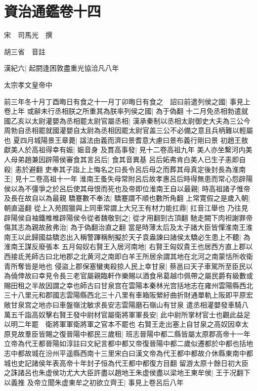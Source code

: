 \chapter{資治通鑑卷十四}
宋　司馬光　撰

胡三省　音註

漢紀六|{
	起閼逢困敦盡重光協洽凡八年}


太宗孝文皇帝中

前三年冬十月丁酉晦日有食之十一月丁卯晦日有食之　詔曰前遣列侯之國|{
	事見上卷上年}
或辭未行丞相朕之所重其為朕率列侯之國|{
	為于偽翻}
十二月免丞相勃遣就國乙亥以太尉灌嬰為丞相罷太尉官屬丞相|{
	漢承秦制以丞相太尉御史大夫為三公今周勃自丞相罷就國灌嬰自太尉為丞相因罷太尉官盖三公不必備之意且兵柄難以輕屬也}
夏四月城陽景王章薨|{
	諡法由義而濟曰景耆意大慮曰景布義行剛曰景}
初趙王敖獻美人於高祖得幸有娠|{
	娠音身}
及貫高事發|{
	見十二卷高祖九年}
美人亦坐繫河内美人母弟趙兼因辟陽侯審食其言呂后|{
	食其音異基}
呂后妬弗肯白美人已生子恚即自殺|{
	恚於避翻}
吏奉其子詣上上悔名之曰長令呂后母之而葬其母真定後封長為淮南王|{
	見十二卷高祖十一年}
淮南王蚤失母常附呂后故孝惠呂后時得無患而常心怨辟陽侯以為不彊爭之於呂后使其母恨而死也及帝即位淮南王自以最親|{
	時高祖諸子惟帝及長在故自以為最親}
驕蹇數不奉法|{
	驕蹇謂不順也數所角翻}
上常寛假之是歲入朝|{
	朝直遥翻}
從上入苑囿獵與上同車常謂上大兄王有材力能扛鼎|{
	扛音江舉也}
乃往見辟陽侯自袖鐵椎椎辟陽侯令從者魏敬剄之|{
	從才用翻剄古頂翻}
馳走闕下肉袒謝罪帝傷其志為親故赦弗治|{
	為于偽翻治直之翻}
當是時薄太后及太子諸大臣皆憚淮南王淮南王以此歸國益驕恣出入稱警蹕稱制擬於天子袁盎諫曰諸侯太驕必生患上不聽|{
	為淮南王謀反廢張本}
五月匈奴右賢王入居河南地|{
	右賢王匈奴貴王也居西方直上郡以西接氐羌師古曰北地郡之北黄河之南即白羊王所居余謂其地在北河之南蒙恬所收衛青所奪皆是地也}
侵盜上郡保塞蠻夷殺掠人民上幸甘泉|{
	蔡邕曰天子車駕所至臣民以為僥倖故曰幸見令長三老官屬親臨軒作樂賜以酒食帛葛越巾佩帶之屬民爵有級數或賜田租之半故因謂之幸也師古曰甘泉宫在雲陽本秦林光宫括地志在雍州雲陽縣西北三十八里元和郡國志雲陽縣西北三十八里有車箱阪縈紆曲折財通單軌上阪即平原宏敞甘泉宫之地亦曰車盤嶺沈敏求長安志雲陽磨石嶺山有甘泉}
遣丞相灌嬰發車騎八萬五千詣高奴擊右賢王發中尉材官屬衛將軍軍長安|{
	此中尉所掌材官士也觀此益足以明二年罷　衛將軍軍衛將軍之官本不罷也}
右賢王走出塞上自甘泉之高奴因幸太原見故羣臣皆賜之復晉陽中都民三歲租|{
	班志晉陽中都二縣皆屬太原郡高帝十一年立帝為代王都晉陽如淳註曰文紀言都中都又帝復晉陽中都二歲似遷都於中都也括地志中都故城在汾州平遥縣西南十三里宋白曰漢文帝為代王都中都故介休縣東南中都城也史記諸侯年表高帝十年封子恒為代王都中都復方目翻}
留游太原十餘日初大臣之誅諸呂也朱虚侯功尤大大臣許盡以趙地王朱虚侯盡以梁地王東牟侯|{
	王于况翻下以義推}
及帝立聞朱虚東牟之初欲立齊王|{
	事見上卷呂后八年}

